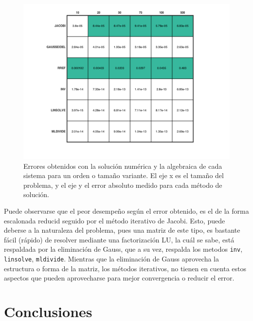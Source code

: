 \documentclass[11pt, spanish]{article}
\begin{document}
\begin{enumerate}
\begin{figure}[htbp]
\centering
	\includegraphics[scale=0.85]{data/img/comparisson}
	\caption{Errores obtenidos con la solución numérica y la algebraica de cada sistema para un orden o tamaño variante. El eje x es el tamaño del problema, y el eje y el error absoluto medido para cada método de solución.}
\end{figure}

Puede observarse que el peor desempeño según el error obtenido, es el de la forma escalonada reducid seguido por el método iterativo de Jacobi. Esto, puede deberse a la naturaleza del problema, pues una matriz de este tipo, es bastante fácil (rápido) de resolver mediante una factorización LU, la cuál se sabe, está respaldada por la eliminación de Gauss, que a su vez, respalda los metodos \texttt{inv}, \texttt{linsolve}, \texttt{mldivide}. Mientras que la eliminación de Gauss aprovecha la estructura o forma de la matriz, los métodos iterativos, no tienen en cuenta estos aspectos que pueden aprovecharse para mejor convergencia o reducir el error.

\end{enumerate}

\newpage

\section{Conclusiones}
\end{document}
